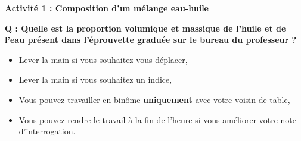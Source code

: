 \renewcommand{\thesubsection}{\textcolor{red}{\Roman{section}.\arabic{subsection}}}
\renewcommand{\thesubsubsection}{\textcolor{red}{\Roman{section}.\arabic{subsection}.\alph{subsubsection}}}

\setcounter{section}{0}
\setcounter{document}{0}
\sndEnTeteActUn

\begin{center}
\begin{mdframed}[style=titr, leftmargin=60pt, rightmargin=60pt, innertopmargin=7pt, innerbottommargin=7pt, innerrightmargin=8pt, innerleftmargin=8pt]

\begin{center}
\large{\textbf{Activité 1 : Composition d'un mélange eau-huile}}
\end{center}

\end{mdframed}
\end{center}
\begin{Large}{\textbf{Q : Quelle est la proportion volumique et massique de l'huile et de l'eau présent dans l'éprouvette graduée sur le bureau du professeur ?}} \end{Large} 
\begin{mdframed}[style=autreexo]
\textbf{}
\begin{itemize}
    \item Lever la main si vous souhaitez vous déplacer,
    \item Lever la main si vous souhaitez un indice,
    \item Vous pouvez travailler en binôme \textbf{\underline{uniquement}} avec votre voisin de table,
    \item Vous pouvez rendre le travail à la fin de l'heure si vous améliorer votre note d'interrogation.
   
\end{itemize}
\end{mdframed}

